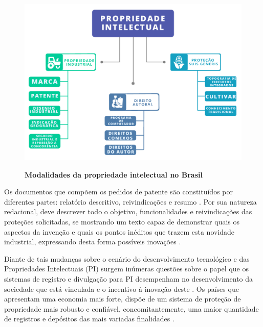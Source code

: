\begin{figure}[H]
\centering
\caption{\textbf{Modalidades da propriedade intelectual no Brasil}}
\includegraphics[scale=0.8]{Imagens/propriedade_intelectual.png}
\label{figura_4}
\end{figure}


Os documentos que compõem os pedidos de patente são constituídos por diferentes partes: relatório descritivo, reivindicações e resumo \cite{inpi_diretrizes_2011}. Por sua natureza redacional, deve descrever todo o objetivo, funcionalidades e reivindicações das proteções solicitadas, se mostrando um texto capaz de demonstrar quais os aspectos da invenção e quais os pontos inéditos que trazem esta novidade industrial, expressando desta forma possíveis inovações \cite{wipo_global_2018}.  


Diante de tais mudanças sobre o cenário do desenvolvimento tecnológico e das Propriedades Intelectuais (PI) surgem inúmeras questões sobre o papel que os sistemas de registro e divulgação para PI desempenham no desenvolvimento da sociedade que está vinculada e o incentivo à inovação deste \cite{segala_os_2016}. Os países que apresentam uma economia mais forte, dispõe de um sistema de proteção de propriedade mais robusto e confiável, concomitantemente, uma maior quantidade de registros e depósitos das mais variadas finalidades \cite{mueller_universidades_2014}.


